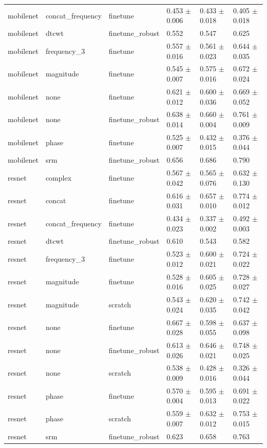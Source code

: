 \begin{table}
\begin{tabular}{llllll}
mobilenet & concat_frequency & finetune & 0.453 $\pm$ 0.006 & 0.433 $\pm$ 0.018 & 0.405 $\pm$ 0.018 \\
mobilenet & dtcwt & finetune_robust & 0.552 & 0.547 & 0.625 \\
mobilenet & frequency_3 & finetune & 0.557 $\pm$ 0.016 & 0.561 $\pm$ 0.023 & 0.644 $\pm$ 0.035 \\
mobilenet & magnitude & finetune & 0.545 $\pm$ 0.007 & 0.575 $\pm$ 0.016 & 0.672 $\pm$ 0.024 \\
mobilenet & none & finetune & 0.621 $\pm$ 0.012 & 0.600 $\pm$ 0.036 & 0.669 $\pm$ 0.052 \\
mobilenet & none & finetune_robust & 0.638 $\pm$ 0.014 & 0.660 $\pm$ 0.004 & 0.761 $\pm$ 0.009 \\
mobilenet & phase & finetune & 0.525 $\pm$ 0.007 & 0.432 $\pm$ 0.015 & 0.376 $\pm$ 0.044 \\
mobilenet & srm & finetune_robust & 0.656 & 0.686 & 0.790 \\
resnet & complex & finetune & 0.567 $\pm$ 0.042 & 0.565 $\pm$ 0.076 & 0.632 $\pm$ 0.130 \\
resnet & concat & finetune & 0.616 $\pm$ 0.031 & 0.657 $\pm$ 0.010 & 0.774 $\pm$ 0.012 \\
resnet & concat_frequency & finetune & 0.434 $\pm$ 0.023 & 0.337 $\pm$ 0.002 & 0.492 $\pm$ 0.003 \\
resnet & dtcwt & finetune_robust & 0.610 & 0.543 & 0.582 \\
resnet & frequency_3 & finetune & 0.523 $\pm$ 0.012 & 0.600 $\pm$ 0.021 & 0.724 $\pm$ 0.022 \\
resnet & magnitude & finetune & 0.528 $\pm$ 0.016 & 0.605 $\pm$ 0.025 & 0.728 $\pm$ 0.027 \\
resnet & magnitude & scratch & 0.543 $\pm$ 0.024 & 0.620 $\pm$ 0.035 & 0.742 $\pm$ 0.042 \\
resnet & none & finetune & 0.667 $\pm$ 0.028 & 0.598 $\pm$ 0.055 & 0.637 $\pm$ 0.098 \\
resnet & none & finetune_robust & 0.613 $\pm$ 0.026 & 0.646 $\pm$ 0.021 & 0.748 $\pm$ 0.025 \\
resnet & none & scratch & 0.538 $\pm$ 0.009 & 0.428 $\pm$ 0.016 & 0.326 $\pm$ 0.044 \\
resnet & phase & finetune & 0.570 $\pm$ 0.004 & 0.595 $\pm$ 0.013 & 0.691 $\pm$ 0.022 \\
resnet & phase & scratch & 0.559 $\pm$ 0.007 & 0.632 $\pm$ 0.012 & 0.753 $\pm$ 0.015 \\
resnet & srm & finetune_robust & 0.623 & 0.658 & 0.763 \\

\end{tabular}
\end{table}
